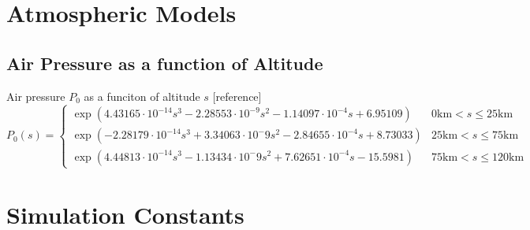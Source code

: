 \documentclass[twocolumn]{article}
\begin{document}
    \onecolumn
    \begin{appendices}
        \section{Atmospheric Models}
        \label{appendix:a}
        \subsection{Air Pressure as a function of Altitude}
            Air pressure $P_0$ as a funciton of altitude $s$ [reference]
            \[P_0(s)=\begin{cases}
                \exp{\left(4.43165\cdot10^{-14}s^3-2.28553\cdot10^{-9}s^2-1.14097\cdot10^{-4}s+6.95109\right)} & 0\textrm{km}<s\leq 25\textrm{km}\\
                \exp{\left(-2.28179\cdot10^{-14}s^3+3.34063\cdot10^-9s^2-2.84655\cdot10^{-4}s+8.73033\right)} & 25\textrm{km} < s \leq 75\textrm{km}\\
                \exp{\left(4.44813\cdot10^{-14}s^3-1.13434\cdot10^-9s^2+7.62651\cdot10^{-4}s-15.5981\right)} & 75\textrm{km} < s \leq 120\textrm{km}
            \end{cases}\]
        \section{Simulation Constants}
    \end{appendices}
\end{document}
